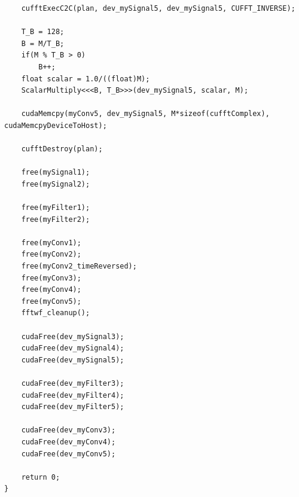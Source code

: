 \begin{lstlisting}
	cufftExecC2C(plan, dev_mySignal5, dev_mySignal5, CUFFT_INVERSE);

	T_B = 128;
	B = M/T_B;
	if(M % T_B > 0)
		B++;
	float scalar = 1.0/((float)M);
	ScalarMultiply<<<B, T_B>>>(dev_mySignal5, scalar, M);

	cudaMemcpy(myConv5, dev_mySignal5, M*sizeof(cufftComplex), cudaMemcpyDeviceToHost);

	cufftDestroy(plan);

	free(mySignal1);
	free(mySignal2);

	free(myFilter1);
	free(myFilter2);

	free(myConv1);
	free(myConv2);
	free(myConv2_timeReversed);
	free(myConv3);
	free(myConv4);
	free(myConv5);
	fftwf_cleanup();

	cudaFree(dev_mySignal3);
	cudaFree(dev_mySignal4);
	cudaFree(dev_mySignal5);

	cudaFree(dev_myFilter3);
	cudaFree(dev_myFilter4);
	cudaFree(dev_myFilter5);

	cudaFree(dev_myConv3);
	cudaFree(dev_myConv4);
	cudaFree(dev_myConv5);

	return 0;
}
\end{lstlisting}
\doublespacing

